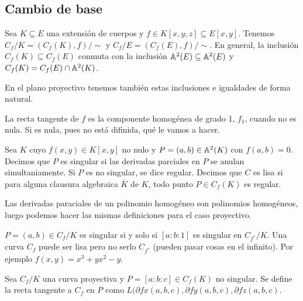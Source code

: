 \documentclass[CR.tex]{subfiles}
\begin{document}
\subsection{Cambio de base}
Sea $K\subseteq E$ una extensión de cuerpos y $f\in K[x,y,z]\subseteq E[x,y]$. Tenemos $C_f/K=(C_f(K),f)/\sim$ y $C_f/E=(C_f(E),f)/\sim$. En general, la inclusión $C_f(K)\subseteq C_f(E)$ conmuta con la inclusión $\mathbb{A}^2(E)\subseteq \mathbb{A}^2(E)$ y $C_f(K)=C_f(E)\cap \mathbb{A}^2(K)$. 

En el plano proyectivo tenemos también estas inclusiones e igualdades de forma natural. 

\begin{defi}
La recta tangente de $f$ es la componente homogénea de grado 1, $f_1$, cuando no es nula. Si es nula, pues no está difinida, qué le vamos a hacer.
\end{defi}

\begin{defi}
Sea $K$ cuyo $f(x,y)\in K[x,y]$ no nulo y $P=(a,b)\in \mathbb{A}^2(K)$ con $f(a,b)=0$. Decimos que $P$ es singular si las derivadas parciales en $P$ se anulan simultaniamente. Si $P$ es no singular, se dice regular. Decimos que $C$ es lisa si para alguna clausura algebraica $\overline{K}$ de $K$, todo punto $P\in C_f(K)$ es regular. 
\end{defi}

Las derivadas paraciales de un polinomio homogéneo son polinomios homogéneos, luego podemos hacer las mismas definiciones para el caso proyectivo.

\begin{nota}
$P=(a,b)\in C_f/K$ es singular si y solo si $[a:b:1]$ es singular en $C_{f^*}/K$. Una curva $C_f$ puede ser lisa pero no serlo $C_{f^*}$ (pueden pasar cosas en el infinito). Por ejemplo $f(x,y)=x^3+yx^2-y$.
\end{nota}
\begin{defi}
Sea $C_f/K$ una curva proyectiva y $P=[a:b:c]\in C_f(K)$ no singular. Se define la recta tangente a $C_f$ en $P$ como $L(\partial{f}{x}(a,b,c),\partial{f}{y}(a,b,c),\partial{f}{z}(a,b,c)$. 
\end{defi}
\end{document}
